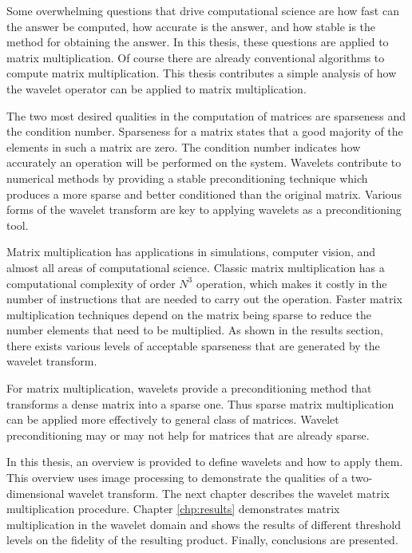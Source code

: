 Some overwhelming questions that drive computational science are how
fast can the answer be computed, how accurate is the answer, and how
stable is the method for obtaining the answer.  In this thesis, these
questions are applied to matrix multiplication. Of course there are already
conventional algorithms to compute matrix multiplication. This thesis
contributes a simple analysis of how the wavelet operator can be applied
to matrix multiplication.

The two most desired qualities in the computation of matrices are
sparseness and the condition number. Sparseness for a matrix states
that a good majority of the elements in such a matrix are zero.  The
condition number indicates how accurately an operation will be
performed on the system.  Wavelets contribute to numerical methods by
providing a stable preconditioning technique which produces a more
sparse and better conditioned than the original matrix.  Various forms
of the wavelet transform are key to applying wavelets as a
preconditioning tool.

Matrix multiplication has applications in simulations, computer
vision, and almost all areas of computational science.  Classic matrix
multiplication has a computational complexity of order $N^3$
operation, which makes it costly in the number of instructions that
are needed to carry out the operation. Faster matrix multiplication
techniques depend on the matrix being sparse to reduce the number
elements that need to be multiplied.  As shown in the results section,
there exists various levels of acceptable sparseness that are
generated by the wavelet transform.

For matrix multiplication, wavelets provide a preconditioning method
that transforms a dense matrix into a sparse one.  Thus sparse matrix
multiplication can be applied more effectively to general class of
matrices.  Wavelet preconditioning may or may not help for matrices
that are already sparse.

In this thesis, an overview is provided to define wavelets and how to
apply them.  This overview uses image processing to demonstrate the
qualities of a two-dimensional wavelet transform.  The next chapter
describes the wavelet matrix multiplication procedure. Chapter
\ref{chp:results} demonstrates matrix multiplication in the wavelet
domain and shows the results of different threshold levels on the
fidelity of the resulting product.  Finally, conclusions are
presented.


